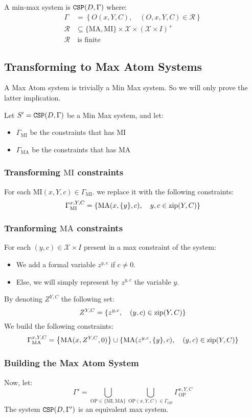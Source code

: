 A min-max system is $\operatorname{\mathtt{CSP}}(D,\Gamma)$ where:
\begin{align*}
	\Gamma&=\left\{O(x,Y,C),\quad (O,x,Y,C)\in \mathscr{R}\right\}\\
	\mathscr{R}&\subseteq \{\text{MA},\text{MI}\}\times\mathcal{X}\times \left(\mathcal{X}\times I\right)^+ \\
	\mathscr{R}&\  \text{is finite}
\end{align*}


\subsection{Transforming to Max Atom Systems}
A Max Atom system is trivially a Min Max system. So we will only prove the latter implication.

Let $S'=\operatorname{\mathtt{CSP}}(D,\Gamma)$ be a Min Max system, and let:
\begin{itemize}
	\item $\Gamma_{\text{MI}}$ be the constraints that has $\text{MI}$ 
	\item $\Gamma_{\text{MA}}$ be the constraints that has $\text{MA}$
\end{itemize}
\subsubsection{Transforming $\text{MI}$ constraints}
For each $\text{MI}(x,Y,c)\in \Gamma_{\text{MI}}.$ we replace it with the following constraints:
$$
\Gamma^{x,Y,C}_{\text{MI}}=\left\{\text{MA}(x,\{y\},c),\quad y,c\in \operatorname{zip}(Y,C)\right\}
$$
\subsubsection{Tranforming $\text{MA}$ constraints}
For each $(y,c)\in \mathcal{X}\times I$ present in a max constraint of the system: \begin{itemize}
	\item We add a formal variable $z^{y,c}$ if $c\ne 0.$
	\item Else, we will simply represent by $z^{y,c}$ the variable $y.$
\end{itemize}
By denoting $Z^{Y,C}$ the following set:
$$
Z^{Y,C}=\{z^{y,c},\quad (y,c)\in \operatorname{zip}(Y,C)\}
$$
We build the following constraints:
$$
\Gamma^{x,Y,C}_{\text{MA}} = \left\{\text{MA}(x,Z^{Y,C},0)\right\}\cup\{\text{MA}(z^{y,c},\{y\},c),\quad (y,c)\in \operatorname{zip}(Y,C)\}
$$
\subsubsection{Building the Max Atom System}
Now, let:
$$
\Gamma'=\bigcup_{\text{OP}\in\{\text{MI},\text{MA}\}}\bigcup_{\text{OP}(x,Y,C)\in \Gamma_{\text{OP}}} \Gamma^{x,Y,C}_{\text{OP}}
$$
The system $\operatorname{\mathtt{CSP}}(D,\Gamma')$ is an equivalent max system.
